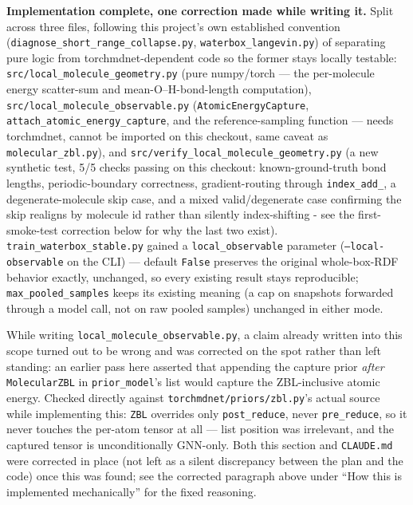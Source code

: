 \documentclass[11pt]{article}
\begin{document}
\textbf{Implementation complete, one correction made while writing it.}
Split across three files, following this project's own established
convention (\texttt{diagnose\_short\_range\_collapse.py},
\texttt{waterbox\_langevin.py}) of separating pure logic from
torchmdnet-dependent code so the former stays locally testable:
\texttt{src/local\_molecule\_geometry.py} (pure numpy/torch --- the
per-molecule energy scatter-sum and mean-O--H-bond-length computation),
\texttt{src/local\_molecule\_observable.py} (\texttt{AtomicEnergyCapture},
\texttt{attach\_atomic\_energy\_capture}, and the reference-sampling
function --- needs torchmdnet, cannot be imported on this checkout, same
caveat as \texttt{molecular\_zbl.py}), and
\texttt{src/verify\_local\_molecule\_geometry.py} (a new synthetic test,
5/5 checks passing on this checkout: known-ground-truth bond lengths,
periodic-boundary correctness, gradient-routing through
\texttt{index\_add\_}, a degenerate-molecule skip case, and a mixed
valid/degenerate case confirming the skip realigns by molecule id rather
than silently index-shifting - see the first-smoke-test correction below
for why the last two exist).
\texttt{train\_waterbox\_stable.py} gained a \texttt{local\_observable}
parameter (\texttt{--local-observable} on the CLI) --- default \texttt{False}
preserves the original whole-box-RDF behavior exactly, unchanged, so every
existing result stays reproducible; \texttt{max\_pooled\_samples} keeps its
existing meaning (a cap on snapshots forwarded through a model call, not on
raw pooled samples) unchanged in either mode.

While writing \texttt{local\_molecule\_observable.py}, a claim already
written into this scope turned out to be wrong and was corrected on the
spot rather than left standing: an earlier pass here asserted that
appending the capture prior \emph{after} \texttt{MolecularZBL} in
\texttt{prior\_model}'s list would capture the ZBL-inclusive atomic energy.
Checked directly against \texttt{torchmdnet/priors/zbl.py}'s actual source
while implementing this: \texttt{ZBL} overrides only \texttt{post\_reduce},
never \texttt{pre\_reduce}, so it never touches the per-atom tensor at all
--- list position was irrelevant, and the captured tensor is unconditionally
GNN-only. Both this section and \texttt{CLAUDE.md} were corrected in place
(not left as a silent discrepancy between the plan and the code) once this
was found; see the corrected paragraph above under ``How this is
implemented mechanically'' for the fixed reasoning.
\end{document}
